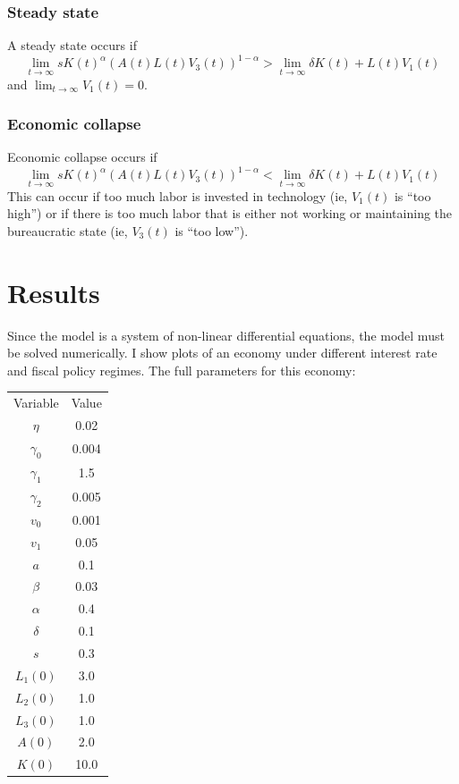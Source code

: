 \documentclass[12pt]{article}
\theoremstyle{definition}
\begin{document}
\subsubsection{Steady state}
A steady state occurs if  
\[\lim_{t \to \infty} s K(t)^\alpha (A(t)L(t)V_3(t))^{1-\alpha} > \lim_{t \to \infty} \delta K(t) +  L(t) V_1(t)\] 
and \(\lim_{t \to \infty} V_1(t) =0\).

\subsubsection{Economic collapse}
Economic collapse occurs if 
\[\lim_{t \to \infty}s K(t)^\alpha (A(t)L(t)V_3(t))^{1-\alpha} < \lim_{t \to \infty} \delta K(t) +  L(t) V_1(t)\] 
This can occur if too much labor is invested in technology (ie, \(V_1(t)\) is ``too high'') or if there is too much labor that is either not working or maintaining the bureaucratic state (ie, \(V_3(t)\) is ``too low'').                                

\section{Results}

Since the model is a system of non-linear differential equations, the model must be solved numerically.  I show plots of an economy under different interest rate and fiscal policy regimes.  The full parameters for this economy:

\begin{center}
\begin{tabular}{ c c }
      Variable  & Value  \\ 
      \(\eta\) & 0.02 \\  
      \(\gamma_0\) & 0.004   \\  
      \(\gamma_1\) & 1.5   \\  
      \(\gamma_2\) & 0.005   \\ 
      \(v_0\) & 0.001  \\  
      \(v_1\) & 0.05  \\  
      \(a\) & 0.1  \\
      \(\beta\) & 0.03   \\  
      \(\alpha\) & 0.4   \\  
      \(\delta\) & 0.1   \\  
      \(s\) & 0.3   \\ 
      \(L_1(0)\) & 3.0   \\ 
      \(L_2(0)\) & 1.0  \\ 
      \(L_3(0)\) & 1.0   \\ 
      \(A(0)\) & 2.0  \\ 
      \(K(0)\) & 10.0   
\end{tabular}
\end{center}
\end{document}
